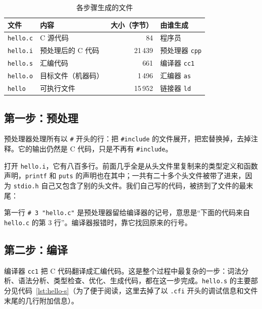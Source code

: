 \begin{table}[htbp]
  \centering
  \caption{各步骤生成的文件}
  \label{tab:hello-files}
  \begin{tabular}{llrl}
    \toprule
    文件 & 内容 & 大小（字节） & 由谁生成 \\
    \midrule
    \texttt{hello.c} & C 源代码       & 84     & 程序员 \\
    \texttt{hello.i} & 预处理后的 C 代码 & 21\,439 & 预处理器 \texttt{cpp} \\
    \texttt{hello.s} & 汇编代码       & 661    & 编译器 \texttt{cc1} \\
    \texttt{hello.o} & 目标文件（机器码） & 1\,496  & 汇编器 \texttt{as} \\
    \texttt{hello}   & 可执行文件     & 15\,952 & 链接器 \texttt{ld} \\
    \bottomrule
  \end{tabular}
\end{table}

\subsection{第一步：预处理}

预处理器处理所有以 \texttt{\#} 开头的行：把 \texttt{\#include} 的文件展开，把宏替换掉，去掉注释。它的输出仍然是 C 代码，只是不再有 \texttt{\#include}。

打开 \texttt{hello.i}，它有八百多行。前面几乎全是从头文件里复制来的类型定义和函数声明，\texttt{printf} 和 \texttt{puts} 的声明也在其中；一共有二十多个头文件被带了进来，因为 \texttt{stdio.h} 自己又包含了别的头文件。我们自己写的代码，被挤到了文件的最末尾：

第一行 \texttt{\# 3 "hello.c"} 是预处理器留给编译器的记号，意思是“下面的代码来自 \texttt{hello.c} 的第 3 行”。编译器报错时，靠它找回原来的行号。

\subsection{第二步：编译}

编译器 \texttt{cc1} 把 C 代码翻译成汇编代码。这是整个过程中最复杂的一步：词法分析、语法分析、类型检查、优化、生成代码，都在这一步完成。\texttt{hello.s} 的主要部分见代码~\ref{lst:hello-s}（为了便于阅读，这里去掉了以 \texttt{.cfi} 开头的调试信息和文件末尾的几行附加信息）。

